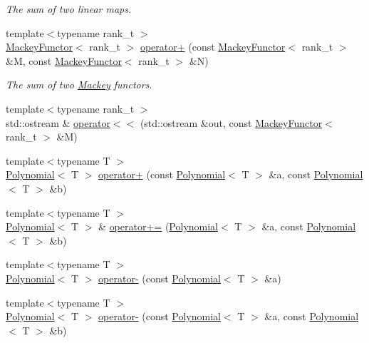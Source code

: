 \begin{DoxyCompactItemize}
\begin{DoxyCompactList}\small\item\em The sum of two linear maps. \end{DoxyCompactList}\item 
{\footnotesize template$<$typename rank\+\_\+t $>$ }\\\hyperlink{classMackey_1_1MackeyFunctor}{Mackey\+Functor}$<$ rank\+\_\+t $>$ \hyperlink{namespaceMackey_a738f2b46b7d0c37be203a17083801bbd}{operator+} (const \hyperlink{classMackey_1_1MackeyFunctor}{Mackey\+Functor}$<$ rank\+\_\+t $>$ \&M, const \hyperlink{classMackey_1_1MackeyFunctor}{Mackey\+Functor}$<$ rank\+\_\+t $>$ \&N)
\begin{DoxyCompactList}\small\item\em The sum of two \hyperlink{namespaceMackey}{Mackey} functors. \end{DoxyCompactList}\item 
{\footnotesize template$<$typename rank\+\_\+t $>$ }\\std\+::ostream \& \hyperlink{namespaceMackey_aaf9e6d978fdb55a757223964390b2fc0}{operator$<$$<$} (std\+::ostream \&out, const \hyperlink{classMackey_1_1MackeyFunctor}{Mackey\+Functor}$<$ rank\+\_\+t $>$ \&M)
\item 
{\footnotesize template$<$typename T $>$ }\\\hyperlink{classMackey_1_1Polynomial}{Polynomial}$<$ T $>$ \hyperlink{namespaceMackey_a61f8cf9c3cf22acfedda5f427423f6c4}{operator+} (const \hyperlink{classMackey_1_1Polynomial}{Polynomial}$<$ T $>$ \&a, const \hyperlink{classMackey_1_1Polynomial}{Polynomial}$<$ T $>$ \&b)
\item 
{\footnotesize template$<$typename T $>$ }\\\hyperlink{classMackey_1_1Polynomial}{Polynomial}$<$ T $>$ \& \hyperlink{namespaceMackey_a29199dd05885558a19e305b49ab7b180}{operator+=} (\hyperlink{classMackey_1_1Polynomial}{Polynomial}$<$ T $>$ \&a, const \hyperlink{classMackey_1_1Polynomial}{Polynomial}$<$ T $>$ \&b)
\item 
{\footnotesize template$<$typename T $>$ }\\\hyperlink{classMackey_1_1Polynomial}{Polynomial}$<$ T $>$ \hyperlink{namespaceMackey_a76e1e4a6dac913bc86971d8515475fa5}{operator-\/} (const \hyperlink{classMackey_1_1Polynomial}{Polynomial}$<$ T $>$ \&a)
\item 
{\footnotesize template$<$typename T $>$ }\\\hyperlink{classMackey_1_1Polynomial}{Polynomial}$<$ T $>$ \hyperlink{namespaceMackey_a803f57e25754b9ca58e4757a46f9b23a}{operator-\/} (const \hyperlink{classMackey_1_1Polynomial}{Polynomial}$<$ T $>$ \&a, const \hyperlink{classMackey_1_1Polynomial}{Polynomial}$<$ T $>$ \&b)

\end{DoxyCompactItemize}
